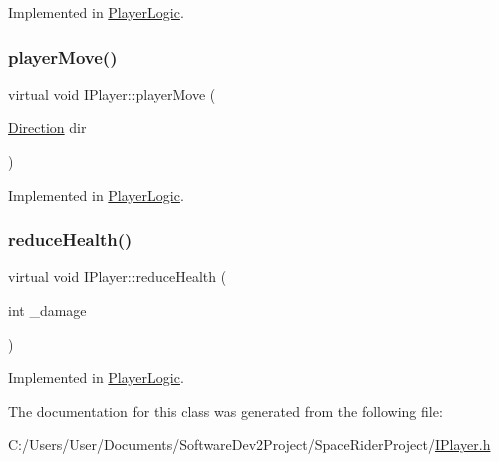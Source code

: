 Implemented in \hyperlink{class_player_logic_a4b77bba06ba630f974aaa85306109485}{Player\+Logic}.

\mbox{\label{class_i_player_a39685438043898f69bcf62c81b60e7b9}} 
\subsubsection{\texorpdfstring{player\+Move()}{playerMove()}}
{\footnotesize\ttfamily virtual void I\+Player\+::player\+Move (\begin{DoxyParamCaption}\item[{\hyperlink{_game_common_data_8h_a224b9163917ac32fc95a60d8c1eec3aa}{Direction}}]{dir }\end{DoxyParamCaption})\hspace{0.3cm}{\ttfamily [pure virtual]}}



Implemented in \hyperlink{class_player_logic_a2b63d2c01e898e5798c2801466c8b432}{Player\+Logic}.

\mbox{\label{class_i_player_a27eab471444f8ae2cf96bee562488b70}} 
\subsubsection{\texorpdfstring{reduce\+Health()}{reduceHealth()}}
{\footnotesize\ttfamily virtual void I\+Player\+::reduce\+Health (\begin{DoxyParamCaption}\item[{int}]{\+\_\+damage }\end{DoxyParamCaption})\hspace{0.3cm}{\ttfamily [pure virtual]}}



Implemented in \hyperlink{class_player_logic_a43c4cfcdfd439ff3ef8015c2170f9381}{Player\+Logic}.



The documentation for this class was generated from the following file\+:\begin{DoxyCompactItemize}
\item 
C\+:/\+Users/\+User/\+Documents/\+Software\+Dev2\+Project/\+Space\+Rider\+Project/\hyperlink{_i_player_8h}{I\+Player.\+h}\end{DoxyCompactItemize}

